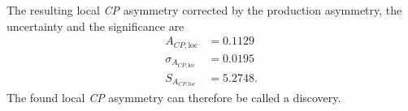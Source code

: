 The resulting local \textit{CP} asymmetry
corrected by the production asymmetry, the uncertainty and the significance are
\begin{align*}
  A_{CP,\mathrm{loc}} &= 0.1129\\
  \sigma_{A_{CP,\mathrm{loc}}} &= 0.0195 \\ %
  S_{A_{CP,\mathrm{loc}}} &= 5.2748.
\end{align*}
The found local \textit{CP} asymmetry can therefore be called a discovery.
